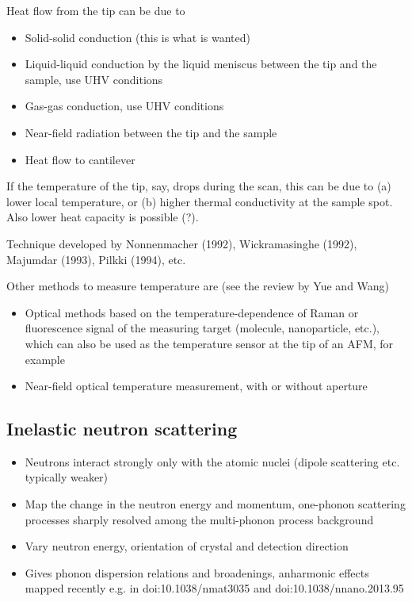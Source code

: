 Heat flow from the tip can be due to
\begin{itemize}
 \item Solid-solid conduction (this is what is wanted)
 \item Liquid-liquid conduction by the liquid meniscus between the tip and the sample, use UHV conditions
 \item Gas-gas conduction, use UHV conditions
 \item Near-field radiation between the tip and the sample
 \item Heat flow to cantilever
\end{itemize}

If the temperature of the tip, say, drops during the scan, this can be due to (a) lower local temperature, or (b) higher thermal conductivity at the sample spot. Also lower heat capacity is possible (?). 

Technique developed by Nonnenmacher (1992), Wickramasinghe (1992), Majumdar (1993), Pilkki (1994), etc.

Other methods to measure temperature are (see the review by Yue and Wang)
\begin{itemize}
 \item Optical methods based on the temperature-dependence of Raman or fluorescence signal of the measuring target (molecule, nanoparticle, etc.), which can also be used as the temperature sensor at the tip of an AFM, for example
 \item Near-field optical temperature measurement, with or without aperture
\end{itemize}

\subsection{Inelastic neutron scattering}
 \begin{itemize}
  \item Neutrons interact strongly only with the atomic nuclei (dipole scattering etc. typically weaker)
  \item Map the change in the neutron energy and momentum, one-phonon scattering processes sharply resolved among the multi-phonon process background
  \item Vary neutron energy, orientation of crystal and detection direction
  \item Gives phonon dispersion relations and broadenings, anharmonic effects mapped recently e.g. in doi:10.1038/nmat3035 and doi:10.1038/nnano.2013.95
 \end{itemize}

